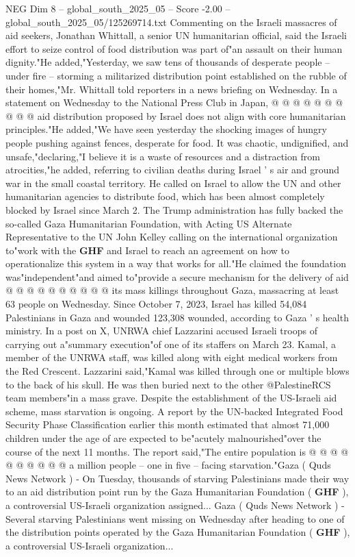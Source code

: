 \begin{textsample}{NEG Dim 8 – global\_south\_2025\_05 – Score -2.00 – global\_south\_2025\_05/125269714.txt}
Commenting on the Israeli massacres of aid seekers, Jonathan Whittall, a senior UN humanitarian official, said the Israeli effort to seize control of food distribution was part of"an assault on their human dignity."He added,"Yesterday, we saw tens of thousands of desperate people -- under fire -- storming a militarized distribution point established on the rubble of their homes,"Mr.
Whittall told reporters in a news briefing on Wednesday.
In a statement on Wednesday to the National Press Club in Japan, @ @ @ @ @ @ @ @ @ @ aid distribution proposed by Israel does not align with core humanitarian principles."He added,"We have seen yesterday the shocking images of hungry people pushing against fences, desperate for food.
It was chaotic, undignified, and unsafe,"declaring,"I believe it is a waste of resources and a distraction from atrocities,"he added, referring to civilian deaths during Israel ' s air and ground war in the small coastal territory.
He called on Israel to allow the UN and other humanitarian agencies to distribute food, which has been almost completely blocked by Israel since March 2.
The Trump administration has fully backed the so-called Gaza Humanitarian Foundation, with Acting US Alternate Representative to the UN John Kelley calling on the international organization to"work with the \textbf{GHF} and Israel to reach an agreement on how to operationalize this system in a way that works for all."He claimed the foundation was"independent"and aimed to"provide a secure mechanism for the delivery of aid @ @ @ @ @ @ @ @ @ @ its mass killings throughout Gaza, massacring at least 63 people on Wednesday.
Since October 7, 2023, Israel has killed 54,084 Palestinians in Gaza and wounded 123,308 wounded, according to Gaza ' s health ministry.
In a post on X, UNRWA chief Lazzarini accused Israeli troops of carrying out a"summary execution"of one of its staffers on March 23.
Kamal, a member of the UNRWA staff, was killed along with eight medical workers from the Red Crescent.
Lazzarini said,"Kamal was killed through one or multiple blows to the back of his skull.
He was then buried next to the other @PalestineRCS team members"in a mass grave.
Despite the establishment of the US-Israeli aid scheme, mass starvation is ongoing.
A report by the UN-backed Integrated Food Security Phase Classification earlier this month estimated that almost 71,000 children under the age of are expected to be"acutely malnourished"over the course of the next 11 months.
The report said,"The entire population is @ @ @ @ @ @ @ @ @ @ a million people -- one in five -- facing starvation."Gaza ( Quds News Network ) - On Tuesday, thousands of starving Palestinians made their way to an aid distribution point run by the Gaza Humanitarian Foundation ( \textbf{GHF} ), a controversial US-Israeli organization assigned...
Gaza ( Quds News Network ) - Several starving Palestinians went missing on Wednesday after heading to one of the distribution points operated by the Gaza Humanitarian Foundation ( \textbf{GHF} ), a controversial US-Israeli organization...

\end{textsample}
